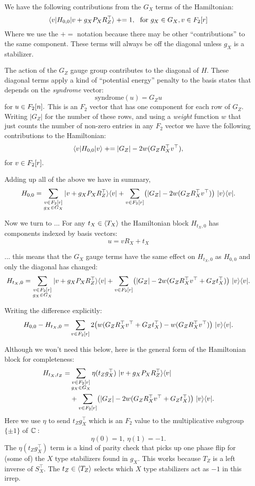 \documentclass[12pt]{article}
\begin{document}
\newcommand{\pluseq}{\mathrel{+}=}

We have the following contributions from the
$G_X$ terms of the Hamiltonian:
$$
    \bra{v} H_{0,0} \ket{v+g_X P_X R_Z^\top} 
        \pluseq 1,\ \ \mbox{for}\ g_X\in G_X, v\in \Fr
$$
Where we use the $\pluseq$ notation
because there may be other ``contributions'' to the
same component.
These terms will always be off
the diagonal unless $g_X$ is a stabilizer.

The action of the $G_Z$ gauge group
contributes to the diagonal of $H.$
These diagonal terms apply a kind of
``potential energy'' penalty
to the basis states
that depends on the \emph{syndrome} vector:
$$
    \mbox{syndrome}(u) = G_Z u
$$
for $u\in F_2[n].$
This is an $F_2$ vector that has one component for
each row of $G_Z.$
Writing $|G_Z|$ for the number of these rows, and 
using a \emph{weight} function $w$ that just counts
the number of non-zero entries in any $F_2$ vector
we have the following contributions to
the Hamiltonian:
$$
    \bra{v} H_{0,0} \ket{v} 
        \pluseq |G_Z| - 2w(G_Z R_X^\top v^\top),
$$
for $v\in F_2[r].$

Adding up all of the above we
have in summary,
$$
H_{0,0} = \sum_{\substack{v\in F_2[r]\\g_X\in G_X } }
  |{v+g_X P_X R_Z^\top}\rangle\langle{v}| 
  + \sum_{v\in F_2[r]} \bigl(|G_Z| - 2w(G_Z R_X^\top v^\top)
    \bigr) \ |{v}\rangle\langle{v}|.
$$

Now we turn to ...
For any $t_X\in \langle T_X \rangle$ the Hamiltonian block $H_{t_X,0}$
has components indexed by basis vectors:
$$
    u = v R_X + t_X
$$

... this means that the $G_X$ gauge terms
have the same effect on $H_{t_X,0}$
as $H_{0,0}$ and only the diagonal has changed:
$$
H_{t_X,0} = \sum_{\substack{v\in F_2[r]\\g_X\in G_X } }
  |{v+g_X P_X R_Z^\top}\rangle\langle{v}| 
  + \sum_{v\in F_2[r]} \bigl(
    |G_Z| - 2w(G_Z R_X^\top v^\top + G_Z t_X^\top)
    \bigr) \ |{v}\rangle\langle{v}|.
$$

Writing the difference explicitly:
$$
    H_{0,0} - H_{t_X,0} = 
  \sum_{v\in F_2[r]} 2\bigl(
    w(G_Z R_X^\top v^\top + G_Z t_X^\top)
    -w(G_Z R_X^\top v^\top)
    \bigr) \ |{v}\rangle\langle{v}|.
$$

Although we won't need this below,
here is the general form of
the Hamiltonian block for completeness:
\begin{align*}
H_{t_X,t_Z} = &\sum_{\substack{v\in F_2[r]\\g_X\in G_X } }
    \eta(t_Z g_X^\top)
  \ |{v+g_X P_X R_Z^\top}\rangle\langle{v}| \\
  &+ \sum_{v\in F_2[r]} \bigl(
    |G_Z| - 2w(G_Z R_X^\top v^\top + G_Z t_X^\top)
    \bigr) \ |{v}\rangle\langle{v}|.
\end{align*}
Here we use $\eta$ to send 
$t_Zg_X^\top$ which is an $F_2$ value
to the multiplicative subgroup $\{\pm1\}$
of $\mathbb{C}:$
$$
    \eta(0) = 1,\ \eta(1) = -1.
$$
The $\eta(t_Zg_X^\top)$ term
is a kind of parity check that
picks up one phase flip for (some of)
the $X$ type stabilizers found in $g_X.$
This works because $T_Z$ is a left inverse
of $S_X^\top.$
The $t_Z\in\langle T_Z \rangle$ selects which
$X$ type stabilizers act as $-1$ in this irrep.
\end{document}
